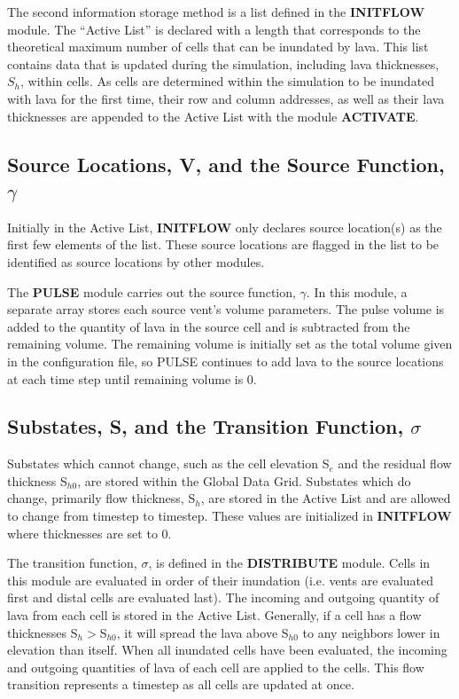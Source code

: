 \documentclass[12pt,letter]{article}
\begin{document}
		The second information storage method is a list defined in the \textbf{INITFLOW} module. The ``Active List'' is declared with a length that corresponds to the theoretical maximum number of cells that can be inundated by lava. This list contains data that is updated during the simulation, including lava thicknesses, $S_h$, within cells. As cells are determined within the simulation to be inundated with lava for the first time, their row and column addresses, as well as their lava thicknesses are appended to the Active List with the module \textbf{ACTIVATE}.
		
	\subsection[Source Locations and the Source Function]{Source Locations, V, and the Source Function, $\gamma$}
		Initially in the Active List, \textbf{INITFLOW} only declares source location(s) as the first few elements of the list. These source locations are flagged in the list to be identified as source locations by other modules.

		The \textbf{PULSE} module carries out the source function, $\gamma$. In this module, a separate array stores each source vent's volume parameters. The pulse volume is added to the quantity of lava in the source cell and is subtracted from the remaining volume. The remaining volume is initially set as the total volume given in the configuration file, so PULSE continues to add lava to the source locations at each time step until remaining volume is 0.
		
	\subsection[Substates and the Transition Function]{Substates, S, and the Transition Function, $\sigma$}
		Substates which cannot change, such as the cell elevation S$_e$ and the residual flow thickness S$_{h0}$, are stored within the Global Data Grid. Substates which do change, primarily flow thickness, S$_h$, are stored in the Active List and are allowed to change from timestep to timestep. These values are initialized in \textbf{INITFLOW} where thicknesses are set to 0.
		
		The transition function, $\sigma$, is defined in the \textbf{DISTRIBUTE} module. Cells in this module are evaluated in order of their inundation (i.e. vents are evaluated first and distal cells are evaluated last). The incoming and outgoing quantity of lava from each cell is stored in the Active List. Generally, if a cell has a flow thicknesses S$_h>$S$_{h0}$, it will spread the lava above S$_{h0}$ to any neighbors lower in elevation than itself. When all inundated cells have been evaluated, the incoming and outgoing quantities of lava of each cell are applied to the cells. This flow transition represents a timestep as all cells are updated at once.
		
\end{document}
